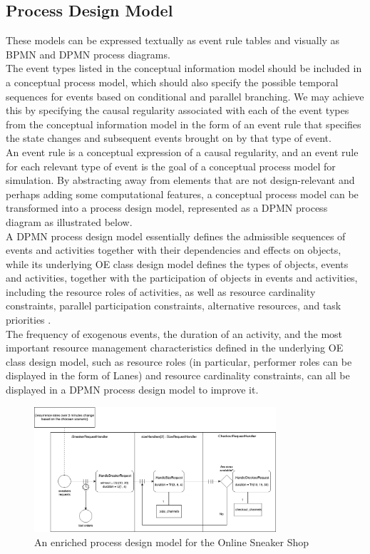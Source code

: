 \documentclass{article}
\begin{document}
\subsection{Process Design Model}
These models can be expressed textually as event rule tables and visually as BPMN and DPMN process diagrams.\\
The event types listed in the conceptual information model should be included in a conceptual process model, which should also specify the possible temporal sequences for events based on conditional and parallel branching. We may achieve this by specifying the causal regularity associated with each of the event types from the conceptual information model in the form of an event rule that specifies the state changes and subsequent events brought on by that type of event.\\
An event rule is a conceptual expression of a causal regularity, and an event rule for each relevant type of event is the goal of a conceptual process model for simulation.
By abstracting away from elements that are not design-relevant and perhaps adding some computational features, a conceptual process model can be transformed into a process design model, represented as a DPMN process diagram as illustrated below.\\
A DPMN process design model essentially defines the admissible sequences of events and activities together with their dependencies and effects on objects, while its underlying OE class design model defines the types of objects, events and activities, together with the participation of objects in events and activities, including the resource roles of activities, as well as resource cardinality constraints, parallel participation constraints, alternative resources, and task priorities \cite{Wagner}. \\ 
The frequency of exogenous events, the duration of an activity, and the most important resource management characteristics defined in the underlying OE class design model, such as resource roles (in particular, performer roles can be displayed in the form of Lanes) and resource cardinality constraints, can all be displayed in a DPMN process design model to improve it. \\
\begin{figure}[h]
    \centering
    \includegraphics[width=0.8\textwidth]{An enriched process design model}
    \caption{An enriched process design model for the Online Sneaker Shop}
\end{figure}
\end{document}

